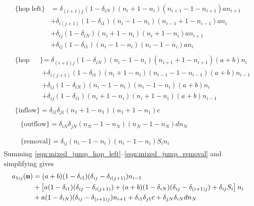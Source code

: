 \begin{align}
    &\begin{aligned}
        \{\text{hop left}\}
        &= \delta_{(i+1)j}(1 - \delta_{iN})(n_i + 1 - n_i)(n_{i+1} - 1 -
        n_{i+1})a n_{i+1}\\
        &+ \delta_{i(j+1)}(1 - \delta_{i1})(n_i - 1 - n_i)(n_{i-1} + 1 -
        n_{i-1})a n_i\\
        &+ \delta_{ij}(1 - \delta_{iN})(n_i + 1 - n_i)(n_i + 1 - n_i)a n_{i+1}\\
        &+ \delta_{ij}(1 - \delta_{i1})(n_i - 1 - n_i)(n_i - 1 - n_i)a n_i
        \label{eqn:mixed_jump_hop_left}
    \end{aligned}\\
    &\begin{aligned}
        \{\text{hop right}\}
        &= \delta_{(i+1)j}(1 - \delta_{iN})(n_i - 1 - n_i)(n_{i+1} + 1 -
        n_{i+1})(a+b) n_i\\
        &+ \delta_{i(j+1)}(1 - \delta_{i1})(n_i + 1 - n_i)(n_{i-1} - 1 -
        n_{i-1})(a+b) n_{i-1}\\
        &+ \delta_{ij}(1 - \delta_{iN})(n_i - 1 - n_i)(n_i - 1 - n_i)(a+b) n_i\\
        &+ \delta_{ij}(1 - \delta_{i1})(n_i + 1 - n_i)(n_i + 1 - n_i)(a+b)
        n_{i-1}
        \label{eqn:mixed_jump_hop_right}
    \end{aligned}\\
    &\begin{aligned}
        \{\text{inflow}\} = \delta_{i1}\delta_{j1} (n_1 + 1 - n_1)(n_1 + 1 -
        n_1)c
        \label{eqn:mixed_jump_inflow}
    \end{aligned}\\
    &\begin{aligned}
        &\{\text{outflow}\} = \delta_{iN}\delta_{jN} (n_N - 1 - n_N)(n_N - 1 - n_N)d
        n_N\\
        \label{eqn:mixed_jump_outflow}
    \end{aligned}\\
    &\begin{aligned}
        &\{\text{removal}\} = \delta_{ij}(n_i - 1 - n_i)(n_i - 1 - n_i)S_i n_i
        \label{eqn:mixed_jump_removal}
    \end{aligned}
\end{align}
Summing \eqref{eqn:mixed_jump_hop_left}--\eqref{eqn:mixed_jump_removal} and
simplifying gives
\begin{equation}
    \begin{aligned}
        a_{1ij}(\mathbf{n}) &= (a+b)(1-\delta_{i1})(\delta_{ij} -
        \delta_{i(j+1)})n_{i-1}\\
        &+ \left[ a(1-\delta_{i1})(\delta_{ij} -
        \delta_{i(j+1)}) + (a+b)(1-\delta_{iN})(\delta_{ij}-\delta_{(i+1)j}) +
    \delta_{ij}S_i \right]n_i\\
    &+ a(1-\delta_{iN})(\delta_{ij} - \delta_{(i+1)j})n_{i+1} +
    \delta_{i1}\delta_{j1}c + \delta_{jN}\delta_{iN}d n_N
    \end{aligned}
\end{equation}
